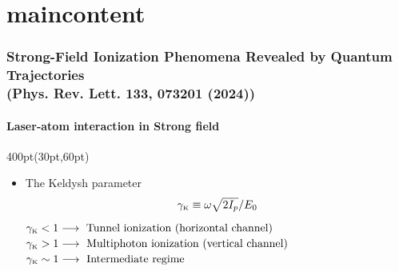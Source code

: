 
\section{maincontent}

\begin{frame}
\frametitle{Strong-Field Ionization Phenomena Revealed by Quantum Trajectories \\
\small (Phys. Rev. Lett. \textbf{133}, 073201 (2024))}
\framesubtitle{Laser-atom interaction in Strong field}


\footnotesize
 
\begin{textblock*}{400pt}(30pt,60pt)
\begin{itemize}
\footnotesize
\item The Keldysh parameter
\begin{align}
\begin{split}
 \gamma_{\mbox{\tiny$\rm K$}} \equiv \omega\sqrt{2I_p}/E_0
\end{split}
 \nonumber 
\end{align}
$\gamma_{\mbox{\tiny$\rm K$}} < 1 \longrightarrow \mbox{ Tunnel ionization (horizontal channel)}$ \\
$\gamma_{\mbox{\tiny$\rm K$}} > 1 \longrightarrow \mbox{ Multiphoton ionization (vertical channel)}$ \\
$\gamma_{\mbox{\tiny$\rm K$}} \sim 1 \longrightarrow \mbox{ Intermediate regime}$ 


\end{itemize}
\end{textblock*}
\end{frame}
